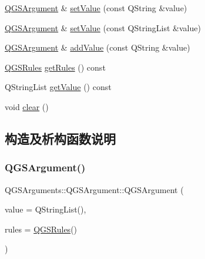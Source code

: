 \begin{DoxyCompactItemize}
\item 
\mbox{\hyperlink{class_q_g_s_arguments_1_1_q_g_s_argument}{Q\+G\+S\+Argument}} \& \mbox{\hyperlink{class_q_g_s_arguments_1_1_q_g_s_argument_aa1fd58eec1d2f6a0c6719201a93eeb09}{set\+Value}} (const Q\+String \&value)
\item 
\mbox{\hyperlink{class_q_g_s_arguments_1_1_q_g_s_argument}{Q\+G\+S\+Argument}} \& \mbox{\hyperlink{class_q_g_s_arguments_1_1_q_g_s_argument_a66a89454e76c3a32a72c10ab5198bad6}{set\+Value}} (const Q\+String\+List \&value)
\item 
\mbox{\hyperlink{class_q_g_s_arguments_1_1_q_g_s_argument}{Q\+G\+S\+Argument}} \& \mbox{\hyperlink{class_q_g_s_arguments_1_1_q_g_s_argument_a1e1535ff6cb2179528ce1e38bfa72a04}{add\+Value}} (const Q\+String \&value)
\item 
\mbox{\hyperlink{class_q_g_s_rules}{Q\+G\+S\+Rules}} \mbox{\hyperlink{class_q_g_s_arguments_1_1_q_g_s_argument_a8ace6e76915c13106a77f7af35e2e9ee}{get\+Rules}} () const
\item 
Q\+String\+List \mbox{\hyperlink{class_q_g_s_arguments_1_1_q_g_s_argument_a4704bd8aa91c91288e5ddbd451b9a32e}{get\+Value}} () const
\item 
void \mbox{\hyperlink{class_q_g_s_arguments_1_1_q_g_s_argument_af86b7e84c97fbce61657bd82b73226fc}{clear}} ()
\end{DoxyCompactItemize}


\subsection{构造及析构函数说明}
\mbox{\label{class_q_g_s_arguments_1_1_q_g_s_argument_a544a55babeef51e1b3d59a4ce3d6e91a}} 
\subsubsection{\texorpdfstring{Q\+G\+S\+Argument()}{QGSArgument()}\hspace{0.1cm}{\footnotesize\ttfamily [1/3]}}
{\footnotesize\ttfamily Q\+G\+S\+Arguments\+::\+Q\+G\+S\+Argument\+::\+Q\+G\+S\+Argument (\begin{DoxyParamCaption}\item[{const Q\+String\+List \&}]{value = {\ttfamily QStringList()},  }\item[{const \mbox{\hyperlink{class_q_g_s_rules}{Q\+G\+S\+Rules}} \&}]{rules = {\ttfamily \mbox{\hyperlink{class_q_g_s_rules}{Q\+G\+S\+Rules}}()} }\end{DoxyParamCaption})}

